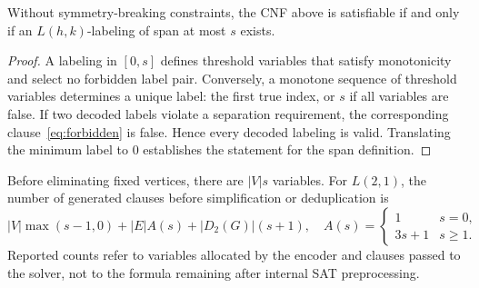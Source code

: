 \begin{proposition}
Without symmetry-breaking constraints, the CNF above is satisfiable if and
only if an $L(h,k)$-labeling of span at most $s$ exists.
\end{proposition}
\begin{proof}
A labeling in $[0,s]$ defines threshold variables that satisfy monotonicity
and select no forbidden label pair. Conversely, a monotone sequence of
threshold variables determines a unique label: the first true index, or $s$
if all variables are false. If two decoded labels violate a separation
requirement, the corresponding clause~\eqref{eq:forbidden} is false. Hence
every decoded labeling is valid. Translating the minimum label to 0
establishes the statement for the span definition.
\end{proof}

Before eliminating fixed vertices, there are $|V|s$ variables. For $L(2,1)$,
the number of generated clauses before simplification or deduplication is
\begin{equation}
 |V|\max(s-1,0)+|E|A(s)+|D_2(G)|(s+1),
 \quad A(s)=\begin{cases}1&s=0,\\3s+1&s\geq1.\end{cases}
\end{equation}
Reported counts refer to variables allocated by the encoder and clauses
passed to the solver, not to the formula remaining after internal SAT preprocessing.

